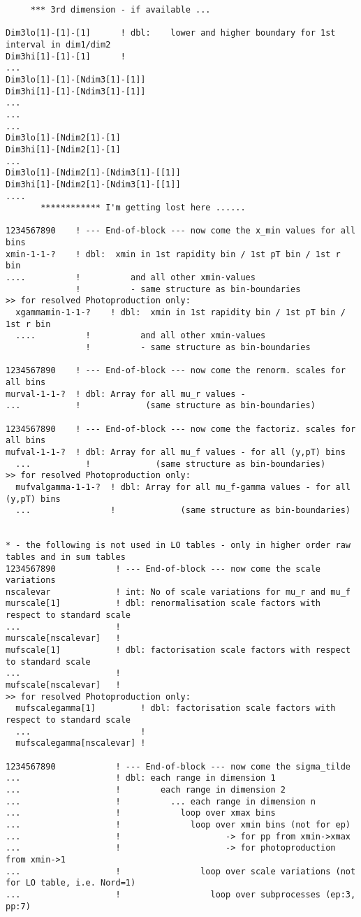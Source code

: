 {\begin{verbatim}
     *** 3rd dimension - if available ...

Dim3lo[1]-[1]-[1]      ! dbl:    lower and higher boundary for 1st interval in dim1/dim2
Dim3hi[1]-[1]-[1]      !
...
Dim3lo[1]-[1]-[Ndim3[1]-[1]]
Dim3hi[1]-[1]-[Ndim3[1]-[1]] 
...
...
...
Dim3lo[1]-[Ndim2[1]-[1]     
Dim3hi[1]-[Ndim2[1]-[1]     
...
Dim3lo[1]-[Ndim2[1]-[Ndim3[1]-[[1]]
Dim3hi[1]-[Ndim2[1]-[Ndim3[1]-[[1]] 
....
       ************ I'm getting lost here ......

1234567890    ! --- End-of-block --- now come the x_min values for all bins
xmin-1-1-?    ! dbl:  xmin in 1st rapidity bin / 1st pT bin / 1st r bin
....          !          and all other xmin-values 
              !          - same structure as bin-boundaries
>> for resolved Photoproduction only:
  xgammamin-1-1-?    ! dbl:  xmin in 1st rapidity bin / 1st pT bin / 1st r bin
  ....          !          and all other xmin-values 
                !          - same structure as bin-boundaries

1234567890    ! --- End-of-block --- now come the renorm. scales for all bins
murval-1-1-?  ! dbl: Array for all mu_r values - 
...           !             (same structure as bin-boundaries)

1234567890    ! --- End-of-block --- now come the factoriz. scales for all bins
mufval-1-1-?  ! dbl: Array for all mu_f values - for all (y,pT) bins
  ...           !             (same structure as bin-boundaries)
>> for resolved Photoproduction only:
  mufvalgamma-1-1-?  ! dbl: Array for all mu_f-gamma values - for all (y,pT) bins
  ...                !             (same structure as bin-boundaries)


* - the following is not used in LO tables - only in higher order raw tables and in sum tables
1234567890            ! --- End-of-block --- now come the scale variations
nscalevar             ! int: No of scale variations for mu_r and mu_f
murscale[1]           ! dbl: renormalisation scale factors with respect to standard scale 
...                   !
murscale[nscalevar]   !
mufscale[1]           ! dbl: factorisation scale factors with respect to standard scale 
...                   !
mufscale[nscalevar]   ! 
>> for resolved Photoproduction only:
  mufscalegamma[1]         ! dbl: factorisation scale factors with respect to standard scale 
  ...                      !
  mufscalegamma[nscalevar] ! 

1234567890            ! --- End-of-block --- now come the sigma_tilde
...                   ! dbl: each range in dimension 1
...                   !        each range in dimension 2
...                   !          ... each range in dimension n
...                   !            loop over xmax bins
...                   !              loop over xmin bins (not for ep)
...                   !                     -> for pp from xmin->xmax             
...                   !                     -> for photoproduction from xmin->1  
...                   !                loop over scale variations (not for LO table, i.e. Nord=1)
...                   !                  loop over subprocesses (ep:3, pp:7)


\end{verbatim}}

